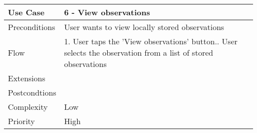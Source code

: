 \begin{tabular}[t]{|l|p{}|}\hline
Use Case&6 - View observations\\\hline
Preconditions&User wants to view locally stored observations\\\hline
Flow&1. User taps the 'View observations' button.\newline
2. User selects the observation from a list of stored observations \\\hline
Extensions& \\\hline
Postcondtions&\\\hline
Complexity&Low\\\hline
Priority&High\\\hline
\end{tabular}